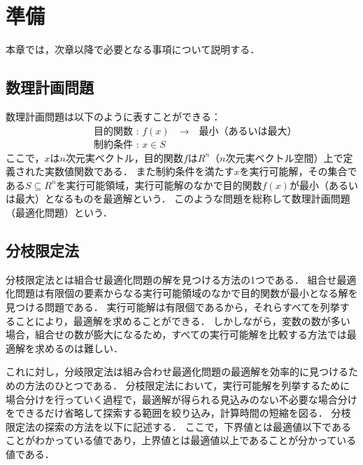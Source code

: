 \chapter{準備}

本章では，次章以降で必要となる事項について説明する．

\section{数理計画問題}

数理計画問題は以下のように表すことができる\cite{数理計画入門}：\\
　　　　　　　　　目的関数 : $f(x)$　→　最小（あるいは最大）\\
　　　　　　　　　制約条件 : $ x \in S$\\
ここで，$x$は$n$次元実ベクトル，目的関数$f$は$R^n$（$n$次元実ベクトル空間）上で定義された実数値関数である．
また制約条件を満たす$x$を実行可能解，その集合である$S \subseteq R^n$を実行可能領域，実行可能解のなかで目的関数$f(x)$が最小（あるいは最大）となるものを最適解という．
このような問題を総称して数理計画問題（最適化問題）という．

\section{分枝限定法}

分枝限定法とは組合せ最適化問題の解を見つける方法の1つである\cite{数理計画入門, ハンドブック}．
組合せ最適化問題は有限個の要素からなる実行可能領域のなかで目的関数が最小となる解を見つける問題である．
実行可能解は有限個であるから，それらすべてを列挙することにより，最適解を求めることができる．
しかしながら，変数の数が多い場合，組合せの数が膨大になるため，すべての実行可能解を比較する方法では最適解を求めるのは難しい．

これに対し，分岐限定法は組み合わせ最適化問題の最適解を効率的に見つけるための方法のひとつである．
分枝限定法において，実行可能解を列挙するために場合分けを行っていく過程で，最適解が得られる見込みのない不必要な場合分けをできるだけ省略して探索する範囲を絞り込み，計算時間の短縮を図る．
分枝限定法の探索の方法を以下に記述する．
ここで，下界値とは最適値以下であることがわかっている値であり，上界値とは最適値以上であることが分かっている値である．

